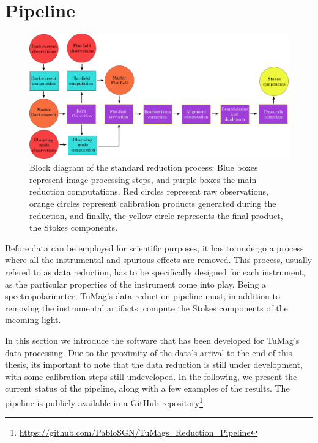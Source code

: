 \section{Pipeline}

\begin{figure}[t]
  \includegraphics[width=\textwidth]{figures/Pipeline/pipeline_diagram.pdf}
  \caption[Reduction pipeline block diagram.]{
    Block diagram of the standard reduction process: Blue boxes represent image processing steps, and purple boxes the main reduction computations. Red circles represent raw observations, orange circles represent calibration products generated during the reduction, and finally, the yellow circle represents the final product, the Stokes components. }
    \label{fig_pipeline: block_diagram}
\end{figure}

Before data can be employed for scientific purposes, it has to undergo a process where all the instrumental and spurious effects are removed. This process, usually refered to as data reduction, has to be specifically designed for each instrument, as the particular properties of the instrument come into play. Being a spectropolarimeter, TuMag's data reduction pipeline must, in addition to removing the instrumental artifacts, compute the Stokes components of the incoming light.

In this section we introduce the software that has been developed for TuMag's data processing. Due to the proximity of the data's arrival to the end of this thesis, its important to note that the data reduction is still under development, with some calibration steps still undeveloped. In the following, we present the current status of the pipeline, along with a few examples of the results. The pipeline is publicly available in a GitHub repository\footnote{\url{https://github.com/PabloSGN/TuMags_Reduction_Pipeline}}.  

